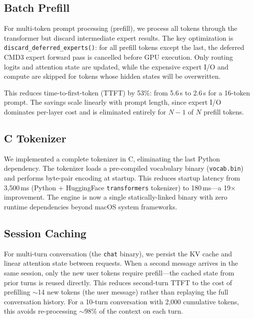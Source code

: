 \documentclass[11pt,twocolumn]{article}
\begin{document}
\subsection{Batch Prefill}
\label{sec:prefill}

For multi-token prompt processing (prefill), we process all tokens through the transformer but discard intermediate expert results.
The key optimization is \texttt{discard\_deferred\_experts()}: for all prefill tokens except the last, the deferred CMD3 expert forward pass is cancelled before GPU execution.
Only routing logits and attention state are updated, while the expensive expert I/O and compute are skipped for tokens whose hidden states will be overwritten.

This reduces time-to-first-token (TTFT) by 53\%: from 5.6\,s to 2.6\,s for a 16-token prompt.
The savings scale linearly with prompt length, since expert I/O dominates per-layer cost and is eliminated entirely for $N-1$ of $N$ prefill tokens.

\subsection{C Tokenizer}
\label{sec:tokenizer}

We implemented a complete tokenizer in C, eliminating the last Python dependency.
The tokenizer loads a pre-compiled vocabulary binary (\texttt{vocab.bin}) and performs byte-pair encoding at startup.
This reduces startup latency from 3{,}500\,ms (Python + HuggingFace \texttt{transformers} tokenizer) to 180\,ms---a 19$\times$ improvement.
The engine is now a single statically-linked binary with zero runtime dependencies beyond macOS system frameworks.

\subsection{Session Caching}
\label{sec:session_cache}

For multi-turn conversation (the \texttt{chat} binary), we persist the KV cache and linear attention state between requests.
When a second message arrives in the same session, only the new user tokens require prefill---the cached state from prior turns is reused directly.
This reduces second-turn TTFT to the cost of prefilling $\sim$14 new tokens (the user message) rather than replaying the full conversation history.
For a 10-turn conversation with 2{,}000 cumulative tokens, this avoids re-processing $\sim$98\% of the context on each turn.
\end{document}
